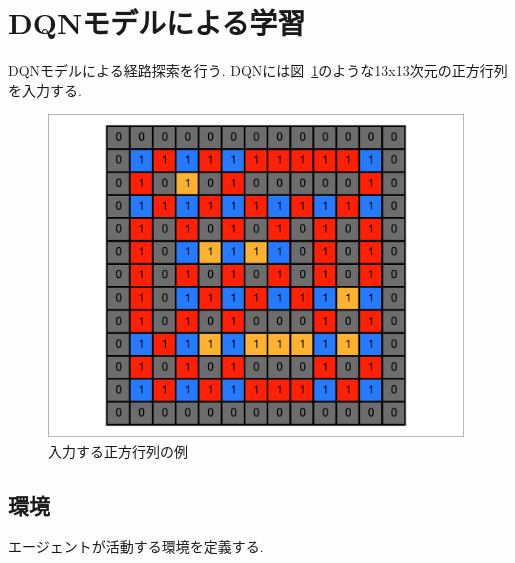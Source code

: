 \section{DQNモデルによる学習}

DQNモデルによる経路探索を行う. DQNには図~\ref{ll_tensor}のような13x13次元の正方行列を入力する.


\begin{figure}[H]
    \centering  %
    \includegraphics[clip,width = 11.0cm]{assets/MAP_6.eps}
    \caption{入力する正方行列の例} \label{ll_tensor}
\end{figure}
  

\subsection{環境}

エージェントが活動する環境を定義する.

